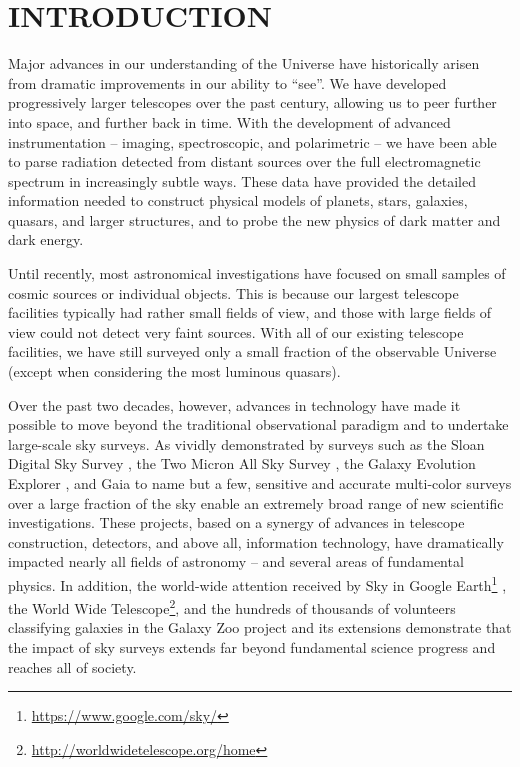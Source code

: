\section{  INTRODUCTION}

Major advances in our understanding of the Universe have historically arisen
from dramatic improvements in our ability to ``see''. We have developed
progressively larger telescopes over the past century, allowing us
to peer further into space, and further back in time. With the development of
advanced instrumentation -- imaging, spectroscopic, and polarimetric -- we
have been able to parse radiation detected from distant sources over the
full electromagnetic spectrum in increasingly subtle ways.
These data have provided the detailed information needed to construct physical
models of planets, stars, galaxies, quasars, and larger structures, and to probe the
new physics of dark matter and dark energy.

Until recently, most astronomical investigations have focused on small samples
of cosmic sources or individual objects. This is because our largest telescope
facilities typically had rather small fields of view, and those with large
fields of view could not detect very faint sources. With all of our existing
telescope facilities, we have still surveyed only a small fraction of the
observable Universe (except when considering the most luminous quasars).

Over the past two decades, however, advances in technology have made it possible to
move beyond the traditional observational paradigm and to undertake large-scale
sky surveys. As vividly demonstrated by surveys such as the Sloan Digital Sky
Survey \citep[SDSS;][]{2000AJ....120.1579Y}, the Two Micron All Sky Survey \citep[2MASS;][]{2006AJ....131.1163S},
the Galaxy Evolution Explorer \citep[GALEX;][]{2005ApJ...619L...1M},
and Gaia \citep{2016A&A...595A...2G} to name but a few, sensitive and accurate
multi-color surveys over a large fraction of the sky enable an extremely broad range of
new scientific investigations. These projects, based on a synergy of advances in
telescope construction, detectors, and above all, information technology,
have dramatically impacted nearly all fields of astronomy
-- and several areas of fundamental physics. In addition, the world-wide attention
received by Sky in Google Earth\footnote{\url{https://www.google.com/sky/}}
\citep{2007arXiv0709.0752S}, the World Wide Telescope\footnote{\url{http://worldwidetelescope.org/home}},
and the hundreds of thousands of volunteers
classifying galaxies in the Galaxy Zoo project \citep{2011MNRAS.410..166L}
and its extensions demonstrate that the impact of sky surveys extends
far beyond fundamental science progress and reaches all of society.

